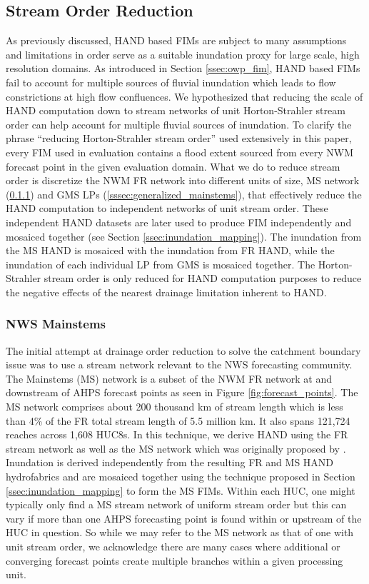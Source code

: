 \documentclass[draft]{dependencies/agujournal2019}
\begin{document}
\subsection{Stream Order Reduction}
\label{ssec:stream_order_reduction}
%
As previously discussed, HAND based FIMs are subject to many assumptions and limitations in order serve as a suitable inundation proxy for large scale, high resolution domains.
As introduced in Section \ref{ssec:owp_fim}, HAND based FIMs fail to account for multiple sources of fluvial inundation which leads to flow constrictions at high flow confluences.
We hypothesized that reducing the scale of HAND computation down to stream networks of unit Horton-Strahler stream order can help account for multiple fluvial sources of inundation.
To clarify the phrase ``reducing Horton-Strahler stream order'' used extensively in this paper, every FIM used in evaluation contains a flood extent sourced from every NWM forecast point in the given evaluation domain.
What we do to reduce stream order is discretize the NWM FR network into different units of size, MS network (\ref{sssec:nws_mainstems}) and GMS LPs (\ref{sssec:generalized_mainstems}), that effectively reduce the HAND computation to independent networks of unit stream order.
These independent HAND datasets are later used to produce FIM independently and mosaiced together (see Section \ref{ssec:inundation_mapping}).
The inundation from the MS HAND is mosaiced with the inundation from FR HAND, while the inundation of each individual LP from GMS is mosaiced together.
The Horton-Strahler stream order is only reduced for HAND computation purposes to reduce the negative effects of the nearest drainage limitation inherent to HAND.
%
\subsubsection{NWS Mainstems}
\label{sssec:nws_mainstems}
%
The initial attempt at drainage order reduction to solve the catchment boundary issue was to use a stream network relevant to the NWS forecasting community. 
The Mainstems (MS) network is a subset of the NWM FR network at and downstream of AHPS forecast points as seen in Figure \ref{fig:forecast_points}.
The MS network comprises about 200 thousand km of stream length which is less than 4\% of the FR total stream length of 5.5 million km.
It also spans 121,724 reaches across 1,608 HUC8s.
In this technique, we derive HAND using the FR stream network as well as the MS network which was originally proposed by .
Inundation is derived independently from the resulting FR and MS HAND hydrofabrics and are mosaiced together using the technique proposed in Section \ref{ssec:inundation_mapping} to form the MS FIMs. 
Within each HUC, one might typically only find a MS stream network of uniform stream order but this can vary if more than one AHPS forecasting point is found within or upstream of the HUC in question.
So while we may refer to the MS network as that of one with unit stream order, we acknowledge there are many cases where additional or converging forecast points create multiple branches within a given processing unit.
%
\end{document}
